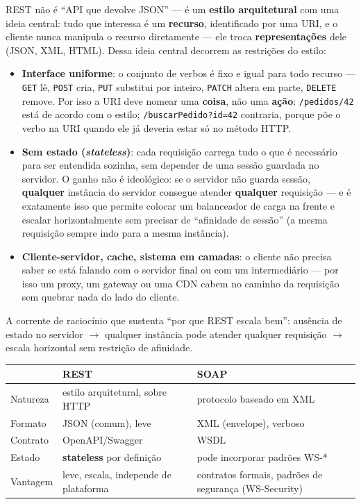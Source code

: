 \begin{conceito}
REST não é “API que devolve JSON” --- é um \textbf{estilo arquitetural}
com uma ideia central: tudo que interessa é um \textbf{recurso},
identificado por uma URI, e o cliente nunca manipula o recurso diretamente
--- ele troca \textbf{representações} dele (JSON, XML, HTML). Dessa ideia
central decorrem as restrições do estilo:

\begin{itemize}
\item \textbf{Interface uniforme}: o conjunto de verbos é fixo e igual para
todo recurso --- \texttt{GET} lê, \texttt{POST} cria, \texttt{PUT}
substitui por inteiro, \texttt{PATCH} altera em parte, \texttt{DELETE}
remove. Por isso a URI deve nomear uma \textbf{coisa}, não uma
\textbf{ação}: \texttt{/pedidos/42} está de acordo com o estilo;
\texttt{/buscarPedido?id=42} contraria, porque põe o verbo na URI quando
ele já deveria estar só no método HTTP.
\item \textbf{Sem estado (\textit{stateless})}: cada requisição carrega
tudo o que é necessário para ser entendida sozinha, sem depender de uma
sessão guardada no servidor. O ganho não é ideológico: se o servidor não
guarda sessão, \textbf{qualquer} instância do servidor consegue atender
\textbf{qualquer} requisição --- e é exatamente isso que permite colocar um
balanceador de carga na frente e escalar horizontalmente sem precisar de
“afinidade de sessão” (a mesma requisição sempre indo para a mesma
instância).
\item \textbf{Cliente-servidor, cache, sistema em camadas}: o cliente não
precisa saber se está falando com o servidor final ou com um
intermediário --- por isso um proxy, um gateway ou uma CDN cabem no
caminho da requisição sem quebrar nada do lado do cliente.
\end{itemize}

A corrente de raciocínio que sustenta “por que REST escala bem”: ausência
de estado no servidor $\to$ qualquer instância pode atender qualquer
requisição $\to$ escala horizontal sem restrição de afinidade.
\end{conceito}

\begin{conceito}
\begin{center}
\begin{tabular}{@{}p{2.6cm}p{4.6cm}p{4.6cm}@{}}
\toprule
& \textbf{REST} & \textbf{SOAP} \\
\midrule
Natureza & estilo arquitetural, sobre HTTP & protocolo baseado em XML \\
Formato & JSON (comum), leve & XML (envelope), verboso \\
Contrato & OpenAPI/Swagger & WSDL \\
Estado & \textbf{stateless} por definição & pode incorporar padrões WS-* \\
Vantagem & leve, escala, independe de plataforma & contratos formais,
padrões de segurança (WS-Security) \\
\bottomrule
\end{tabular}
\end{center}
\end{conceito}

